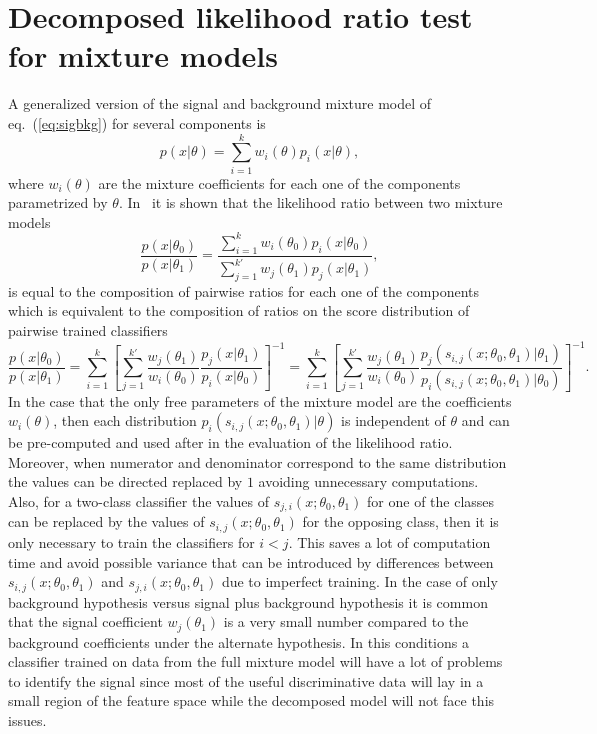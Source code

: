 \documentclass[a4paper]{jpconf}
\begin{document}
\section{Decomposed likelihood ratio test for mixture models}\label{S:DLR}
A generalized version of the signal and background mixture  model of eq.~(\ref{eq:sigbkg}) for several components is 
\begin{equation}
p(x|\theta)=\sum_{i=1}^k w_i(\theta) p_i(x|\theta),  
\end{equation}
where $w_i(\theta)$ are the mixture coefficients for each one of the components parametrized by $\theta$. In~\cite{Cranmer2015} it is shown that the likelihood ratio between two mixture models
\begin{equation}
\frac{p(x|\theta_0)}{p(x|\theta_1)}= \frac{ \sum_{i=1}^k  w_i(\theta_0) p_i(x|\theta_0)}{\sum_{j=1}^{k'} w_{j}(\theta_1) p_{j}(x| \theta_1)}, 
\end{equation}
is equal to the composition of pairwise ratios for each one of the components which is equivalent to the composition of ratios on the score distribution of pairwise trained classifiers
\begin{equation}\label{eq:decomp}
\frac{p(x|\theta_0)}{p(x|\theta_1)} = \sum_{i=1}^k \left[ \sum_{j=1}^{k'} \frac{ w_{j}(\theta_1)}{w_i(\theta_0)} \frac{ p_{j}(x|\theta_1)}{  p_i(x| \theta_0)}  \right]^{-1} = \sum_{i=1}^k \left[ \sum_{j=1}^{k'} \frac{ w_{j}(\theta_1)}{w_i(\theta_0)} \frac{ p_{j}(s_{i,j}(x;\theta_0, \theta_1)|\theta_1)}{  p_i(s_{i,j}(x;\theta_0, \theta_1)| \theta_0)}  \right]^{-1}.
\end{equation}
In the case that the only free parameters of the mixture model are the coefficients $w_i(\theta)$, then each distribution $p_i(s_{i,j}(x;\theta_0, \theta_1)|\theta)$ is independent of $\theta$ and can be pre-computed and used after in the evaluation of the likelihood ratio. Moreover, when numerator and denominator correspond to the same distribution the values can be directed replaced by $1$ avoiding unnecessary computations. Also, for a two-class classifier the values of $s_{j,i}(x;\theta_0,\theta_1)$ for one of the classes can be replaced by the values of $s_{i,j}(x;\theta_0,\theta_1)$ for the opposing class, then it is only necessary to train the classifiers for $i < j$. This saves a lot of computation time and avoid possible variance that can be introduced by differences between $s_{i,j}(x;\theta_0, \theta_1)$ and $s_{j,i}(x;\theta_0, \theta_1)$ due to imperfect training.
In the case of only background hypothesis versus signal plus background hypothesis it is common that the signal coefficient $w_{j}(\theta_1)$ is a very small number compared to the background coefficients under the alternate hypothesis. In this conditions a classifier trained on data from the full mixture model will have a lot of problems to identify the signal since most of the useful discriminative data will lay in a small region of the feature space while the decomposed model will not face this issues.
\end{document}
